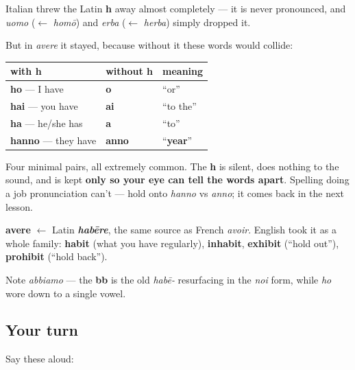 \begin{grammarlens}[title={Grammar Lens: why silent h survives}]
Italian threw the Latin \textbf{h} away almost completely — it is never pronounced, and \emph{uomo} ($\leftarrow$ \emph{homō}) and \emph{erba} ($\leftarrow$ \emph{herba}) simply dropped it.

But in \emph{avere} it stayed, because without it these words would collide:

\noindent
\begin{tabularx}{\linewidth}{@{}>{\raggedright\arraybackslash}X>{\raggedright\arraybackslash}X>{\raggedright\arraybackslash}X@{}}
\toprule
\textbf{with h} & \textbf{without h} & \textbf{meaning} \\
\midrule
\textbf{ho} — I have & \textbf{o} & \textquotedblleft{}or\textquotedblright{} \\
\textbf{hai} — you have & \textbf{ai} & \textquotedblleft{}to the\textquotedblright{} \\
\textbf{ha} — he/she has & \textbf{a} & \textquotedblleft{}to\textquotedblright{} \\
\textbf{hanno} — they have & \textbf{anno} & \textquotedblleft{}\textbf{year}\textquotedblright{} \\
\bottomrule
\end{tabularx}

Four minimal pairs, all extremely common. The \textbf{h} is silent, does nothing to the sound, and is kept \textbf{only so your eye can tell the words apart}. Spelling doing a job pronunciation can't — hold onto \emph{hanno} vs \emph{anno}; it comes back in the next lesson.
\end{grammarlens}

\begin{cousinweb}
\textbf{avere} $\leftarrow$ Latin \emph{\textbf{habēre}}, the same source as French \emph{avoir}. English took it as a whole family: \textbf{habit} (what you have regularly), \textbf{inhabit}, \textbf{exhibit} (\textquotedblleft{}hold out\textquotedblright{}), \textbf{prohibit} (\textquotedblleft{}hold back\textquotedblright{}).

Note \emph{abbiamo} — the \textbf{bb} is the old \emph{habē-} resurfacing in the \emph{noi} form, while \emph{ho} wore down to a single vowel.
\end{cousinweb}

\subsection*{Your turn}
Say these aloud:

